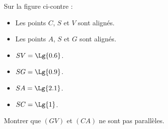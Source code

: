 \begin{exercice*}
    \phantom{rrr}

    \begin{minipage}{0.65\linewidth}
        Sur la figure ci-contre :
        \begin{itemize}
            \item Les points $C$, $S$ et $V$ sont alignés.
            \item Les points $A$, $S$ et $G$ sont alignés.            
            \item $SV=\Lg{0.6}$.
            \item $SG=\Lg{0.9}$.
            \item $SA=\Lg{2.1}$.
            \item $SC=\Lg{1}$.
        \end{itemize}
    \end{minipage}
    \begin{minipage}{0.35\linewidth}        
    \end{minipage}

    Montrer que $(GV)$ et $(CA)$ ne sont pas parallèles.

\end{exercice*}
\begin{corrige}
    \phantom{rrr}

    
\end{corrige}

